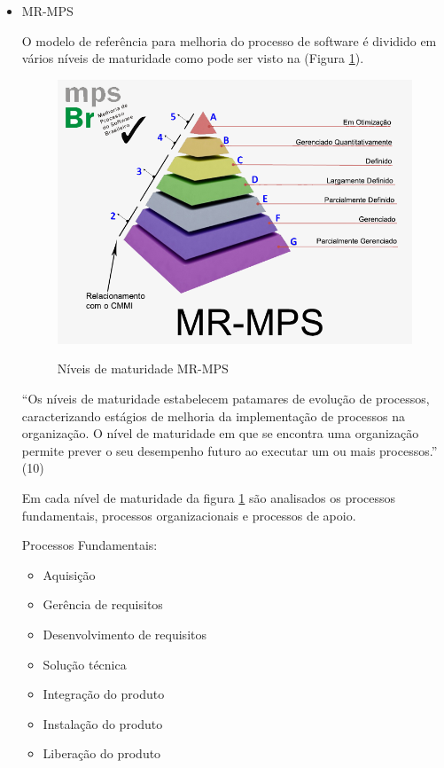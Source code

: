 \begin{itemize}

\item MR-MPS

O modelo de referência para melhoria do processo de software é dividido em vários níveis de maturidade como pode ser visto na (Figura \ref{img:MR-MPS2}).

\FloatBarrier
\begin{figure}[!htpd]
		\centering
		\caption{Níveis de maturidade MR-MPS}
		\includegraphics[scale=2.2]{figuras/MR-MPS2}
		\label{img:MR-MPS2}
\end{figure}
\FloatBarrier

“Os níveis de maturidade estabelecem patamares de evolução de processos, caracterizando estágios de melhoria da implementação de processos na organização. O nível de maturidade em que se encontra uma organização permite prever o seu desempenho futuro ao executar um ou mais processos.” (10)

Em cada nível de maturidade da figura \ref{img:MR-MPS2}  são analisados os processos fundamentais, processos organizacionais e processos de apoio.

Processos Fundamentais:

\begin{itemize}
\item Aquisição
\item Gerência de requisitos
\item Desenvolvimento de requisitos
\item Solução técnica
\item Integração do produto
\item Instalação do produto
\item Liberação do produto
\end{itemize}


\end{itemize}
